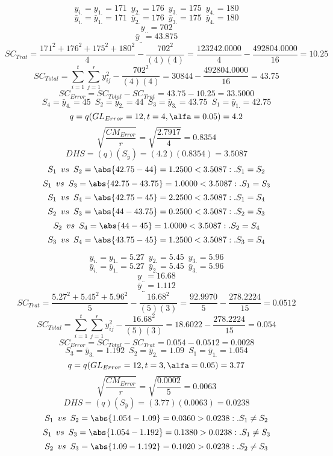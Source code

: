 % 
$$y_{i.}=y_{1.}=171 \enspace y_{2.}=176 \enspace y_{3.}=175 \enspace y_{4.}=180$$
$$\bar{y}_{i.}=\bar{y}_{1.}=171 \enspace \bar{y}_{2.}=176 \enspace \bar{y}_{3.}=175 \enspace \bar{y}_{4.}=180$$
$$y_{..}=702$$
$$\bar{y}_{..}=43.875$$
$$SC_{Trat}=\frac{171^{2}+176^{2}+175^{2}+180^{2}}{4}-\frac{702^{2}}{(4)(4)}=\frac{123242.0000}{4}-\frac{492804.0000}{16}=10.25$$
$$SC_{Total}=\sum_{i=1}^{\mathit{t}}\sum_{j=1}^{\mathit{r}}y_{ij}^{2}-\frac{702^{2}}{(4)(4)}=30844-\frac{492804.0000}{16}=43.75$$
$$SC_{Error}=SC_{Total}-SC_{Trat}=43.75-10.25=33.5000$$
$$S_{4}=\bar{y}_{4.}=45 \enspace S_{2}=\bar{y}_{2.}=44 \enspace S_{3}=\bar{y}_{3.}=43.75 \enspace S_{1}=\bar{y}_{1.}=42.75$$
$$q=q(GL_{Error}=12, t=4, \alfa=0.05)=4.2$$
$$\sqrt{\frac{CM_{Error}}{r}}=\sqrt{\frac{2.7917}{4}}=0.8354$$
$$DHS=(q)(S_{\bar{y}})=(4.2)(0.8354)=3.5087$$
$$S_{1} \enspace vs \enspace S_{2} = \abs{42.75-44}=1.2500<3.5087:.S_{1}=S_{2}$$
$$S_{1} \enspace vs \enspace S_{3} = \abs{42.75-43.75}=1.0000<3.5087:.S_{1}=S_{3}$$
$$S_{1} \enspace vs \enspace S_{4} = \abs{42.75-45}=2.2500<3.5087:.S_{1}=S_{4}$$
$$S_{2} \enspace vs \enspace S_{3} = \abs{44-43.75}=0.2500<3.5087:.S_{2}=S_{3}$$
$$S_{2} \enspace vs \enspace S_{4} = \abs{44-45}=1.0000<3.5087:.S_{2}=S_{4}$$
$$S_{3} \enspace vs \enspace S_{4} = \abs{43.75-45}=1.2500<3.5087:.S_{3}=S_{4}$$

% 
$$y_{i.}=y_{1.}=5.27 \enspace y_{2.}=5.45 \enspace y_{3.}=5.96$$
$$\bar{y}_{i.}=\bar{y}_{1.}=5.27 \enspace \bar{y}_{2.}=5.45 \enspace \bar{y}_{3.}=5.96$$
$$y_{..}=16.68$$
$$\bar{y}_{..}=1.112$$
$$SC_{Trat}=\frac{5.27^{2}+5.45^{2}+5.96^{2}}{5}-\frac{16.68^{2}}{(5)(3)}=\frac{92.9970}{5}-\frac{278.2224}{15}=0.0512$$
$$SC_{Total}=\sum_{i=1}^{\mathit{t}}\sum_{j=1}^{\mathit{r}}y_{ij}^{2}-\frac{16.68^{2}}{(5)(3)}=18.6022-\frac{278.2224}{15}=0.054$$
$$SC_{Error}=SC_{Total}-SC_{Trat}=0.054-0.0512=0.0028$$
$$S_{3}=\bar{y}_{3.}=1.192 \enspace S_{2}=\bar{y}_{2.}=1.09 \enspace S_{1}=\bar{y}_{1.}=1.054$$
$$q=q(GL_{Error}=12, t=3, \alfa=0.05)=3.77$$
$$\sqrt{\frac{CM_{Error}}{r}}=\sqrt{\frac{0.0002}{5}}=0.0063$$
$$DHS=(q)(S_{\bar{y}})=(3.77)(0.0063)=0.0238$$
$$S_{1} \enspace vs \enspace S_{2} = \abs{1.054-1.09}=0.0360>0.0238:.S_{1}\not=S_{2}$$
$$S_{1} \enspace vs \enspace S_{3} = \abs{1.054-1.192}=0.1380>0.0238:.S_{1}\not=S_{3}$$
$$S_{2} \enspace vs \enspace S_{3} = \abs{1.09-1.192}=0.1020>0.0238:.S_{2}\not=S_{3}$$